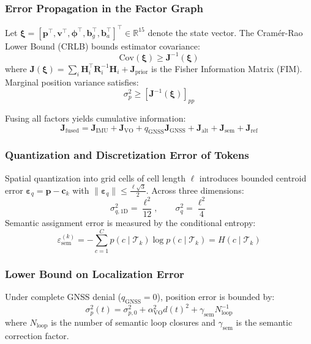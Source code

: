 \subsubsection{Error Propagation in the Factor Graph}
Let $\boldsymbol{\xi} = [\mathbf{p}^\top, \mathbf{v}^\top, \boldsymbol{\phi}^\top, \mathbf{b}_g^\top, \mathbf{b}_a^\top]^\top \in \mathbb{R}^{15}$ denote the state vector. The Cram\'er-Rao Lower Bound (CRLB) bounds estimator covariance:
\begin{equation}
  \mathrm{Cov}(\boldsymbol{\xi}) \ge \mathbf{J}^{-1}(\boldsymbol{\xi})
\end{equation}
where $\mathbf{J}(\boldsymbol{\xi}) = \sum_i \mathbf{H}_i^\top \mathbf{R}_i^{-1} \mathbf{H}_i + \mathbf{J}_{\text{prior}}$ is the Fisher Information Matrix (FIM). Marginal position variance satisfies:
\begin{equation}
  \sigma_p^2 \ge [\mathbf{J}^{-1}(\boldsymbol{\xi})]_{pp}
\end{equation}

Fusing all factors yields cumulative information:
\begin{equation}
  \mathbf{J}_{\text{fused}} = \mathbf{J}_{\text{IMU}} + \mathbf{J}_{\text{VO}} + q_{\text{GNSS}}\mathbf{J}_{\text{GNSS}} + \mathbf{J}_{\text{alt}} + \mathbf{J}_{\text{sem}} + \mathbf{J}_{\text{ref}}
\end{equation}

\subsubsection{Quantization and Discretization Error of Tokens}
Spatial quantization into grid cells of cell length $\ell$ introduces bounded centroid error $\boldsymbol{\varepsilon}_q = \mathbf{p} - \mathbf{c}_k$ with $\|\boldsymbol{\varepsilon}_q\| \le \frac{\ell\sqrt{3}}{2}$. Across three dimensions:
\begin{equation}
  \sigma_{q,1\text{D}}^2 = \frac{\ell^2}{12}, \qquad \sigma_q^2 = \frac{\ell^2}{4}
\end{equation}
Semantic assignment error is measured by the conditional entropy:
\begin{equation}
  \varepsilon_{\text{sem}}^{(k)} = -\sum_{c=1}^C p(c \mid \mathcal{T}_k) \log p(c \mid \mathcal{T}_k) = H(c \mid \mathcal{T}_k)
\end{equation}

\subsubsection{Lower Bound on Localization Error}
Under complete GNSS denial ($q_{\text{GNSS}} = 0$), position error is bounded by:
\begin{equation}
  \sigma_p^2(t) = \sigma_{p,0}^2 + \alpha_{\text{VO}}^2 d(t)^2 + \gamma_{\text{sem}} N_{\text{loop}}^{-1}
\end{equation}
where $N_{\text{loop}}$ is the number of semantic loop closures and $\gamma_{\text{sem}}$ is the semantic correction factor.

